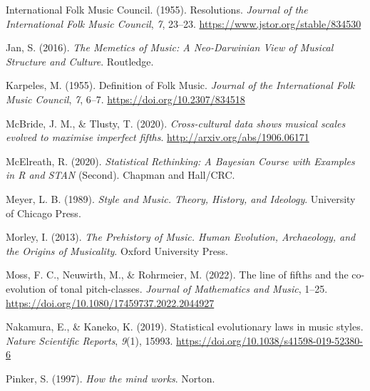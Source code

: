 \documentclass[
  a4paperpaper,
  ,captions=tableheading
]{scrbook}
\newlength{\cslhangindent}
\newlength{\cslentryspacingunit} %
\newenvironment{CSLReferences}[2] %
 {%
  \setlength{\parindent}{0pt}
  \ifodd #1
  \let\oldpar\par
  \def\par{\hangindent=\cslhangindent\oldpar}
  \fi
  \setlength{\parskip}{#2\cslentryspacingunit}
 }%
 {}
\begin{document}
\begin{CSLReferences}{1}{0}
\leavevmode{}%
International Folk Music Council. (1955). Resolutions. \emph{Journal of
the International Folk Music Council}, \emph{7}, 23--23.
\url{https://www.jstor.org/stable/834530}

\leavevmode{}%
Jan, S. (2016). \emph{{The Memetics of Music: A Neo-Darwinian View of
Musical Structure and Culture}}. Routledge.

\leavevmode{}%
Karpeles, M. (1955). Definition of {Folk Music}. \emph{Journal of the
International Folk Music Council}, \emph{7}, 6--7.
\url{https://doi.org/10.2307/834518}

\leavevmode{}%
McBride, J. M., \& Tlusty, T. (2020). \emph{Cross-cultural data shows
musical scales evolved to maximise imperfect fifths}.
\url{http://arxiv.org/abs/1906.06171}

\leavevmode{}%
McElreath, R. (2020). \emph{Statistical {Rethinking}: {A Bayesian
Course} with {Examples} in {R} and {STAN}} (Second). {Chapman and
Hall/CRC}.

\leavevmode{}%
Meyer, L. B. (1989). \emph{Style and {Music}. {Theory}, {History}, and
{Ideology}}. {University of Chicago Press}.

\leavevmode{}%
Morley, I. (2013). \emph{The {Prehistory} of {Music}. {Human Evolution},
{Archaeology}, and the {Origins} of {Musicality}}. {Oxford University
Press}.

\leavevmode{}%
Moss, F. C., Neuwirth, M., \& Rohrmeier, M. (2022). The line of fifths
and the co-evolution of tonal pitch-classes. \emph{Journal of
Mathematics and Music}, 1--25.
\url{https://doi.org/10.1080/17459737.2022.2044927}

\leavevmode{}%
Nakamura, E., \& Kaneko, K. (2019). Statistical evolutionary laws in
music styles. \emph{Nature Scientific Reports}, \emph{9}(1), 15993.
\url{https://doi.org/10.1038/s41598-019-52380-6}

\leavevmode{}%
Pinker, S. (1997). \emph{How the mind works}. {Norton}.


\end{CSLReferences}
\end{document}
